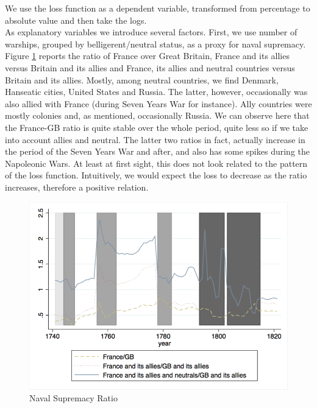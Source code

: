 \documentclass[12pt,a4paper,notitlepage,english]{article}
\begin{document}
We use the loss function as a dependent variable, transformed from percentage to absolute value and then take the logs. \\
As explanatory variables we introduce several factors. 
First, we use number of warships, grouped by belligerent/neutral status, as a proxy for naval supremacy. Figure \ref{naval_supremacy_ratios} reports the ratio of France over Great Britain, France and its allies versus Britain and its allies and France, its allies and neutral countries versus Britain and its allies. Mostly, among neutral countries, we find Denmark, Hanseatic cities, United States and Russia. The latter, however, occasionally was also allied with France (during Seven Years War for instance). Ally countries were mostly colonies and, as mentioned, occasionally Russia. 
We can observe here that the France-GB ratio is quite stable over the whole period, quite less so if we take into account allies and neutral. The latter two ratios in fact, actually increase in the period of the Seven Years War and after, and also has some spikes during the Napoleonic Wars. At least at first sight, this does not look related to the pattern of the loss function. Intuitively, we would expect the loss to decrease as the ratio increases, therefore a positive relation. 
\begin{center}
\begin{figure}[H]
\caption{Naval Supremacy Ratio}
\label{naval_supremacy_ratios}
\includegraphics[scale=.51]{naval_supremacy_ratios.png}
\end{figure}
\end{center}
\end{document}
